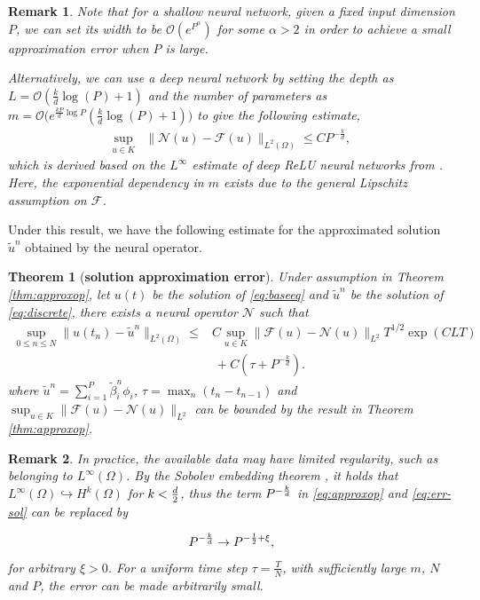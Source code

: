 \documentclass[preprint,12pt]{elsarticle}
\theoremstyle{plain}
\newtheorem{theorem}{Theorem}[section]
\newtheorem{remark}{Remark}[section]
\numberwithin{figure}{section}
\numberwithin{table}{section}
\begin{document}
\begin{remark}
	Note that for a shallow neural network, given a fixed input dimension $P$, we can set its width to be $\mathcal{O}(e^{P^\alpha})$ for some $\alpha > 2$ in order to achieve a small approximation error when $P$ is large.
	
	
	Alternatively, we can use a deep neural network by setting the depth as $L=\mathcal{O}(\frac{k}{d}\log(P)+1)$ and the number of parameters as $m=\mathcal{O}\big(e^{\frac{kP}{d}\log{P}}(\frac{k}{d}\log(P)+1)\big)$ to give the following estimate, 
	\begin{equation}
		\begin{aligned}
			\sup_{u\in K} &\|\mathcal{N}(u)-\mathcal{F}(u)\|_{L^2(\Omega)}
			\le CP^{-{\frac{k}{d}}},
		\end{aligned}
	\end{equation}
	which is derived based on the $L^\infty$ estimate of deep ReLU neural networks from \cite{yarotsky2017error}. Here, the exponential dependency in $m$ exists due to the general Lipschitz assumption on $\mathcal{F}$.
\end{remark}
Under this result, we have the following estimate for the approximated solution $\widetilde{u}^n$ obtained by the neural operator.
\begin{theorem}[\bf solution approximation error]
	\label{thm:err-sol}
	Under assumption in Theorem \ref{thm:approxop}, let $u(t)$ be the solution of \eqref{eq:baseeq} and $\widetilde{u}^n$ be the solution of \eqref{eq:discrete}, there exists a neural operator $\mathcal{N}$ such that
	\begin{equation}\label{eq:err-sol}
		\begin{aligned}
			\sup_{0\le n\le N}	\| u(t_n) - \widetilde{u}^n\|_{L^2(\Omega)} \le &  
			C\sup_{u\in K}\|\mathcal{F}(u)-\mathcal{N}(u)\|_{L^2} T^{1/2}\exp(CLT)\\
			&~ +C(\tau+P^{-{\frac{k}{d}}}) .
		\end{aligned}
	\end{equation}
	where $\widetilde{u}^n = \sum_{i=1}^P \widetilde{{\beta}}^n_i\phi_i$, $\tau=\max_n(t_n-t_{n-1})$ and $\sup_{u\in K}\|\mathcal{F}(u)-\mathcal{N}(u)\|_{L^2}$ can be bounded by the result in Theorem \ref{thm:approxop}.
\end{theorem}

\begin{remark}
	In practice, the available data may have limited regularity, such as belonging to $L^\infty(\Omega)$. By the Sobolev embedding theorem  \cite{adams2003sobolev}, it holds that $L^\infty(\Omega) \hookrightarrow H^k(\Omega)$ for $k<{d\over 2}$, 
	thus the term $P^{-{k\over d}}$ in \eqref{eq:approxop} and \eqref{eq:err-sol} can be replaced by
	
	\begin{equation}
		P^{-{k\over d}} \rightarrow P^{-{1\over 2}+\xi}, 
	\end{equation}
	for arbitrary $\xi >0$. For a uniform time step $\tau = \frac{T}{N}$, with sufficiently large $m$, $N$ and $P$, the error can be made arbitrarily small.
\end{remark}
\end{document}
